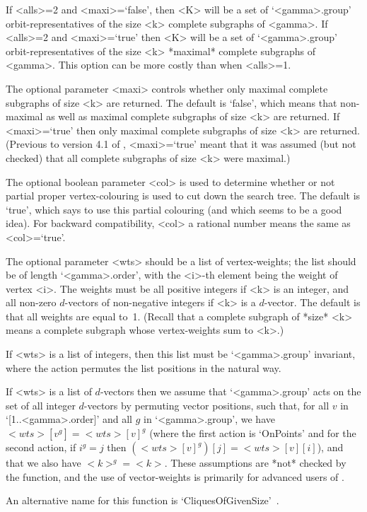 If <alls>=2 and <maxi>=`false', then <K> will be a set of `<gamma>.group'
orbit-representatives of the size <k> complete subgraphs of <gamma>.
If <alls>=2 and <maxi>=`true' then <K> will be a set of `<gamma>.group'
orbit-representatives of the size <k> *maximal* complete subgraphs
of <gamma>.  This option can be more costly than when <alls>=1.

The optional parameter <maxi> controls whether only maximal complete
subgraphs of size <k> are returned.  The default is `false', which means
that non-maximal as well as maximal complete subgraphs of size <k> are
returned. If <maxi>=`true' then only maximal complete subgraphs of size
<k> are returned. (Previous to version 4.1 of {\GRAPE}, <maxi>=`true'
meant that it was assumed (but not checked) that all complete subgraphs
of size <k> were maximal.)

The optional boolean parameter <col> is used to determine whether or
not partial proper vertex-colouring is used to cut down the search
tree. The default is `true', which says to use this partial colouring
(and which seems to be a good idea).  For backward compatibility, <col>
a rational number means the same as <col>=`true'.

The optional parameter <wts> should be a list of vertex-weights; the list
should be of length `<gamma>.order', with the <i>-th element being the
weight of vertex <i>. The weights must be all positive integers if <k>
is an integer, and all non-zero $d$-vectors of non-negative integers
if <k> is a $d$-vector. The default is that all weights are equal to~1.
(Recall that a complete subgraph of *size* <k> means a complete subgraph
whose vertex-weights sum to <k>.)

If <wts> is a list of integers, then this list must be `<gamma>.group'
invariant, where the action permutes the list positions in the natural
way.

If <wts> is a list of $d$-vectors then we assume that `<gamma>.group' acts
on the set of all integer $d$-vectors by permuting vector positions, such
that, for all $v$ in `[1..<gamma>.order]' and all $g$ in `<gamma>.group',
we have $<wts>[v^g] = <wts>[v]^g$ (where the first action is `OnPoints'
and for the second action, if $i^g=j$ then $(<wts>[v]^g)[j]=<wts>[v][i]$),
and that we also have $<k>^g=<k>$.  These assumptions are *not* checked
by the function, and the use of vector-weights is primarily for advanced
users of {\GRAPE}.

An alternative name for this function is 
`CliquesOfGivenSize'~.


